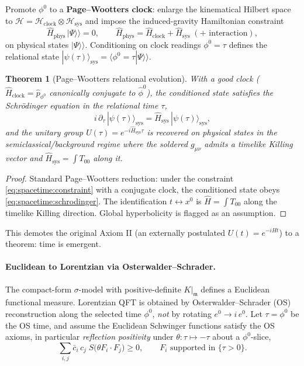 \documentclass[11pt]{article}
\theoremstyle{plain}
\newtheorem{theorem}{Theorem}[section]
\theoremstyle{definition}
\theoremstyle{remark}
\begin{document}
Promote $\phi^0$ to a \textbf{Page--Wootters clock}: enlarge the kinematical Hilbert
space to $\mathcal H=\mathcal H_{\mathrm{clock}}\otimes\mathcal H_{\mathrm{sys}}$ and
impose the induced-gravity Hamiltonian constraint
\begin{equation}\label{eq:spacetime:constraint}
  \widehat H_{\mathrm{phys}}\,|\Psi\rangle\!\rangle=0,\qquad
  \widehat H_{\mathrm{phys}}=\widehat H_{\mathrm{clock}}+\widehat H_{\mathrm{sys}}
  \;(+\text{ interaction}),
\end{equation}
on physical states $|\Psi\rangle\!\rangle$. Conditioning on clock readings $\phi^0=\tau$
defines the relational state $|\psi(\tau)\rangle_{\mathrm{sys}}=\langle\phi^0{=}\tau|\Psi\rangle\!\rangle$.

\begin{theorem}[Page--Wootters relational evolution]\label{thm:spacetime:PW}
With a good clock ($\widehat H_{\mathrm{clock}}=\widehat p_{\phi^0}$ canonically
conjugate to $\widehat\phi^0$), the conditioned state satisfies the Schr\"odinger
equation in the relational time $\tau$,
\begin{equation}\label{eq:spacetime:schrodinger}
  i\,\partial_\tau\,|\psi(\tau)\rangle_{\mathrm{sys}}
  =\widehat H_{\mathrm{sys}}\,|\psi(\tau)\rangle_{\mathrm{sys}},
\end{equation}
and the unitary group $U(\tau)=e^{-i\widehat H_{\mathrm{sys}}\tau}$ is recovered on
physical states in the semiclassical/background regime where the soldered $g_{\mu\nu}$
admits a timelike Killing vector and $\widehat H_{\mathrm{sys}}=\int T_{00}$ along it.
\end{theorem}
\begin{proof}
Standard Page--Wootters reduction: under the constraint
\eqref{eq:spacetime:constraint} with a conjugate clock, the conditioned state obeys
\eqref{eq:spacetime:schrodinger}. The identification $t\leftrightarrow x^0$ is
$\widehat H=\int T_{00}$ along the timelike Killing direction. Global hyperbolicity is
flagged as an assumption.
\end{proof}

This demotes the original Axiom II (an externally postulated $U(t)=e^{-iHt}$) to a
theorem: time is emergent.

\paragraph{Euclidean to Lorentzian via Osterwalder--Schrader.}
The compact-form $\sigma$-model with positive-definite $K|_{\mathfrak m}$ defines a
Euclidean functional measure. Lorentzian QFT is obtained by Osterwalder--Schrader (OS)
reconstruction along the selected time $\phi^0$, \emph{not} by rotating
$e^0\to i\,e^0$. Let $\tau=\phi^0$ be the OS time, and assume the Euclidean Schwinger
functions satisfy the OS axioms, in particular \emph{reflection positivity} under
$\theta:\tau\mapsto-\tau$ about a $\phi^0$-slice,
\begin{equation}\label{eq:spacetime:reflpos}
  \sum_{i,j}\bar c_i\,c_j\;S\bigl(\theta F_i\cdot F_j\bigr)\ge0,
  \qquad F_i \text{ supported in }\{\tau>0\}.
\end{equation}
\end{document}
